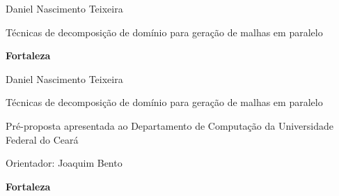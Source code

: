 \pagestyle{empty}

\begin{titlepage}


\begin{center}
{\LARGE Daniel Nascimento Teixeira}
\par
\vspace{200pt}
{\Huge Técnicas de decomposição de domínio para geração de malhas em paralelo}
\par
\vfill
\textbf{{\large Fortaleza}\\
{\large \the\year}}
\end{center}
\end{titlepage}

\cleardoublepage

\pagestyle{fancy}



\thispagestyle{empty}

\begin{center}
{\LARGE Daniel Nascimento Teixeira}
\par
\vspace{200pt}
{\Huge Técnicas de decomposição de domínio para geração de malhas em paralelo}
\end{center}
\par
\vspace{90pt}
\hspace*{175pt}\parbox{7.6cm}{{\large Pré-proposta apresentada ao Departamento de Computação da Universidade Federal do Ceará}}

\par
\vspace{1em}
\hspace*{175pt}\parbox{7.6cm}{{\large Orientador: Joaquim Bento}}

\par
\vfill
\begin{center}
\textbf{{\large Fortaleza}\\
{\large \the\year}}
\end{center}

